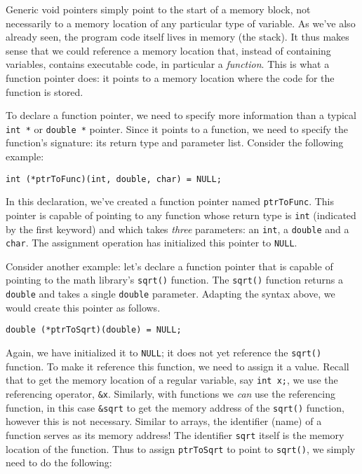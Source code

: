 Generic void pointers simply point to the start of a memory block, not 
necessarily to a memory location of any particular type of variable.  As
we've also already seen, the program code itself lives in memory (the
stack).  It thus makes sense that we could reference a memory location
that, instead of containing variables, contains executable code, in 
particular a \emph{function}.  This is what a function pointer does:
it points to a memory location where the code for the function is
stored.

To declare a function pointer, we need to specify more information than a
typical \texttt{int *} or \texttt{double *} pointer.  Since
it points to a function, we need to specify the function's signature: its
return type and parameter list.  Consider the following example:

\texttt{int (*ptrToFunc)(int, double, char) = NULL;}

In this declaration, we've created a function pointer named \texttt{ptrToFunc}.
This pointer is capable of pointing to any function whose return type is
\texttt{int} (indicated by the first keyword) and which takes 
\emph{three} parameters: an \texttt{int}, a \texttt{double} 
and a \texttt{char}.  The assignment operation has initialized this
pointer to \texttt{NULL}.

Consider another example: let's declare a function pointer that is capable
of pointing to the math library's \texttt{sqrt()} function.  The
\texttt{sqrt()} function returns a \texttt{double} and takes
a single \texttt{double} parameter.  Adapting the syntax above, 
we would create this pointer as follows.

\texttt{double (*ptrToSqrt)(double) = NULL;}

Again, we have initialized it to \texttt{NULL}; it does not yet
reference the \texttt{sqrt()} function.  To make it reference this
function, we need to assign it a value.  Recall that to get the memory
location of a regular variable, say \texttt{int x;}, we use the
referencing operator, \texttt{&x}.  Similarly, with functions we
\emph{can} use the referencing function, in this case \texttt{&sqrt}
to get the memory address of the \texttt{sqrt()} function, however
this is not necessary.  Similar to arrays, the identifier (name) of a
function serves as its memory address!  The identifier \texttt{sqrt} 
itself is the memory location of the function.  Thus to assign 
\texttt{ptrToSqrt} to point to \texttt{sqrt()}, we simply
need to do the following:

